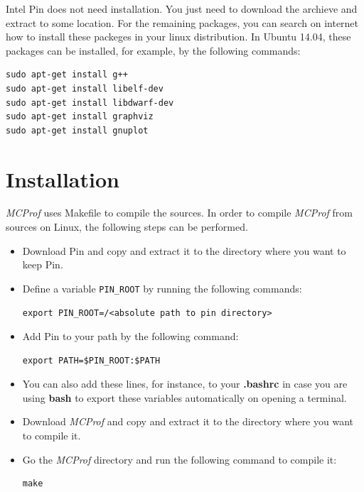 \documentclass[10pt]{article}
\newcommand{\MCPROF}{\emph{MCProf}}
\begin{document}
Intel Pin does not need installation. You just need to download the archieve and 
extract to some location. For the remaining packages, you can search on internet 
how to install these packeges in your linux distribution. In Ubuntu 14.04, these 
packages can be installed, for example, by the following commands:

{
\small
\begin{Verbatim}[frame=single, samepage=true]
sudo apt-get install g++
sudo apt-get install libelf-dev
sudo apt-get install libdwarf-dev
sudo apt-get install graphviz
sudo apt-get install gnuplot
\end{Verbatim}
}



\section{Installation}
\label{sec:installation}

\MCPROF{} uses Makefile to compile the sources. In order to compile \MCPROF{}
from sources on Linux, the following steps can be performed.

\begin{itemize}

\item Download Pin and copy and extract it to the directory where you want to
    keep Pin.

\item Define a variable \verb|PIN_ROOT| by running the following commands:

{
\small
\begin{Verbatim}[frame=single]
export PIN_ROOT=/<absolute path to pin directory>
\end{Verbatim}
}

\item Add Pin to your path by the following command:
{
\small
\begin{Verbatim}[frame=single]
export PATH=$PIN_ROOT:$PATH
\end{Verbatim}
}

\item You can also add these lines, for instance, to your \textbf{.bashrc} in case
    you are using \textbf{bash} to export these variables automatically on opening
    a terminal.

\item Download \MCPROF{} and copy and extract it to the directory where you want
    to compile it.

\item Go the \MCPROF{} directory and run the following command to compile it:

{
\small
\begin{Verbatim}[frame=single]
make
\end{Verbatim}
}

\end{itemize}
\end{document}
